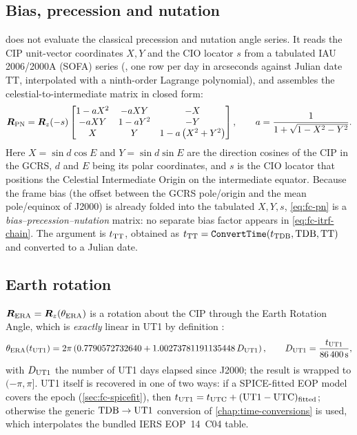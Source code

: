 \subsection{Bias, precession and nutation}

\lupnt{} does not evaluate the classical precession and nutation angle
series. It reads the CIP unit-vector coordinates $X, Y$ and the CIO locator
$s$ from a tabulated IAU 2006/2000A (SOFA) series
(, one row per day in arcseconds
against Julian date TT, interpolated with a ninth-order Lagrange
polynomial), and assembles the celestial-to-intermediate matrix in closed
form:
%
\begin{equation}
  \label{eq:fc-pn}
  \bm{R}_{\mathrm{PN}}
  =
  \bm{R}_z(-s)
  \begin{bmatrix}
    1-aX^2 & -aXY   & -X \\
    -aXY   & 1-aY^2 & -Y \\
    X      & Y      & 1-a\left(X^2+Y^2\right)
  \end{bmatrix},
  \qquad
  a = \frac{1}{1+\sqrt{1-X^2-Y^2}} .
\end{equation}
%
Here $X = \sin d\cos E$ and $Y = \sin d\sin E$ are the direction cosines of
the CIP in the GCRS, $d$ and $E$ being its polar coordinates, and $s$ is the
CIO locator that positions the Celestial Intermediate Origin on the
intermediate equator. Because the frame bias (the offset between the GCRS
pole/origin and the mean pole/equinox of J2000) is already folded into the
tabulated $X, Y, s$, \cref{eq:fc-pn} is a \emph{bias--precession--nutation}
matrix: no separate bias factor appears in \cref{eq:fc-itrf-chain}. The
argument is $t_{\mathrm{TT}}$, obtained as
$t_{\mathrm{TT}} = \texttt{ConvertTime}(t_{\mathrm{TDB}}, \mathrm{TDB}, \mathrm{TT})$ and converted to a
Julian date.

\subsection{Earth rotation}

$\bm{R}_{\mathrm{ERA}} = \bm{R}_z(\theta_{\mathrm{ERA}})$ is a rotation
about the CIP through the Earth Rotation Angle, which is \emph{exactly}
linear in UT1 by definition \citep{iers2010}:
%
\begin{equation}
  \label{eq:fc-era}
  \theta_{\mathrm{ERA}}(t_{\mathrm{UT1}})
  =
  2\pi\left(0.7790572732640 + 1.00273781191135448\, D_{\mathrm{UT1}}\right),
  \qquad
  D_{\mathrm{UT1}} = \frac{t_{\mathrm{UT1}}}{\SI{86400}{\second}},
\end{equation}
%
with $D_{\mathrm{UT1}}$ the number of UT1 days elapsed since J2000; the result is
wrapped to $(-\pi,\pi]$. UT1 itself is recovered in one of two ways: if a
SPICE-fitted EOP model covers the epoch (\cref{sec:fc-spicefit}), then
$t_{\mathrm{UT1}} = t_{\mathrm{UTC}} + (\mathrm{UT1}-\mathrm{UTC})_{\text{fitted}}$; otherwise the
generic $\mathrm{TDB}\to\mathrm{UT1}$ conversion of \cref{chap:time-conversions} is used,
which interpolates the bundled IERS EOP~14~C04 table.

